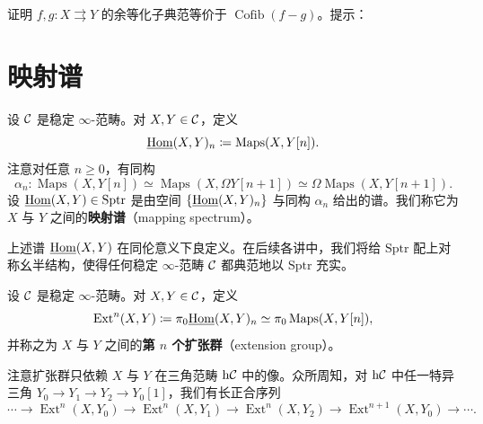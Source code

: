 \begin{exercise}\label{L15-2.13}
证明 $f,g:X\rightrightarrows Y$ 的余等化子典范等价于 $\operatorname{Cofib}(f-g)$。提示：
\begin{center}
\end{center}
\end{exercise}

\section{映射谱}

\begin{construction}\label{L15-3.1}
设 $\mathcal{C}$ 是稳定 $\infty$-范畴。对 $X,Y\in\mathcal{C}$，定义
\[
\underline{\operatorname{Hom}}(X,Y)_{n}\coloneqq\operatorname{Maps}(X,Y[n]).
\]
注意对任意 $n\ge 0$，有同构
\[
\alpha_{n}:\operatorname{Maps}(X,Y[n])\simeq\operatorname{Maps}(X,\Omega Y[n+1])\simeq\Omega\operatorname{Maps}(X,Y[n+1]).
\]
设 $\underline{\operatorname{Hom}}(X,Y)\in\mathrm{Sptr}$ 是由空间 $\{\underline{\operatorname{Hom}}(X,Y)_{n}\}$ 与同构 $\alpha_{n}$ 给出的谱。我们称它为 $X$ 与 $Y$ 之间的\textbf{映射谱}（mapping spectrum）。
\end{construction}

\begin{remark}\label{L15-3.2}
上述谱 $\underline{\operatorname{Hom}}(X,Y)$ 在同伦意义下良定义。在后续各讲中，我们将给 $\mathrm{Sptr}$ 配上对称幺半结构，使得任何稳定 $\infty$-范畴 $\mathcal{C}$ 都典范地以 $\mathrm{Sptr}$ 充实。
\end{remark}

\begin{definition}\label{L15-3.3}
设 $\mathcal{C}$ 是稳定 $\infty$-范畴。对 $X,Y\in\mathcal{C}$，定义
\[
\operatorname{Ext}^{n}(X,Y)\coloneqq\pi_{0}\underline{\operatorname{Hom}}(X,Y)_{n}\simeq\pi_{0}\operatorname{Maps}(X,Y[n]),
\]
并称之为 $X$ 与 $Y$ 之间的\textbf{第 $n$ 个扩张群}（extension group）。
\end{definition}

\nitem\label{L15-3.4} 注意扩张群只依赖 $X$ 与 $Y$ 在三角范畴 $\mathrm{h}\mathcal{C}$ 中的像。众所周知，对 $\mathrm{h}\mathcal{C}$ 中任一特异三角 $Y_{0}\to Y_{1}\to Y_{2}\to Y_{0}[1]$，我们有长正合序列
\[
\cdots\to\operatorname{Ext}^{n}(X,Y_{0})\to\operatorname{Ext}^{n}(X,Y_{1})\to\operatorname{Ext}^{n}(X,Y_{2})\to\operatorname{Ext}^{n+1}(X,Y_{0})\to\cdots.
\]

